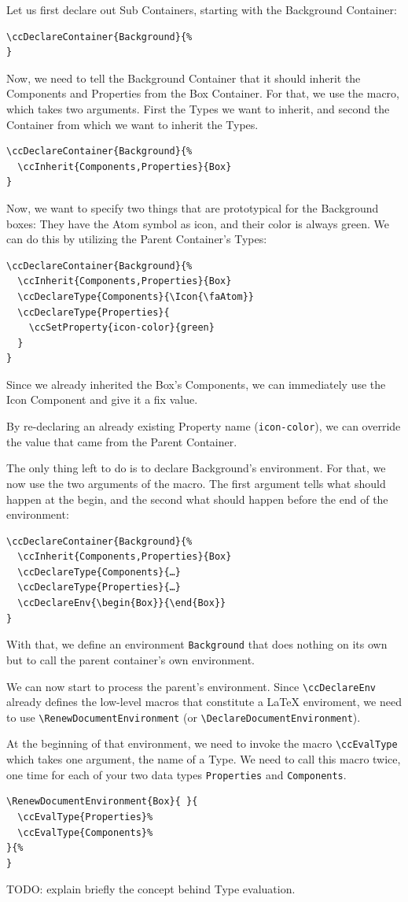 Let us first declare out Sub Containers, starting with the Background
Container:
\begin{lstlisting}
\ccDeclareContainer{Background}{%
}
\end{lstlisting}
Now, we need to tell the Background Container that it should inherit
the Components and Properties from the Box Container. For that, we use
the \UsageMacro{\ccInherit} macro, which takes two arguments. First
the Types we want to inherit, and second the Container from which we
want to inherit the Types.
\begin{lstlisting}
\ccDeclareContainer{Background}{%
  \ccInherit{Components,Properties}{Box}
}
\end{lstlisting}
Now, we want to specify two things that are prototypical for the
Background boxes: They have the Atom symbol as icon, and their color
is always green. We can do this by utilizing the Parent Container's
Types:
\begin{lstlisting}
\ccDeclareContainer{Background}{%
  \ccInherit{Components,Properties}{Box}
  \ccDeclareType{Components}{\Icon{\faAtom}}
  \ccDeclareType{Properties}{
    \ccSetProperty{icon-color}{green}
  }
}
\end{lstlisting}
Since we already inherited the Box's Components, we can immediately
use the Icon Component and give it a fix value.

By re-declaring an already existing Property name
(\texttt{icon-color}), we can override the value that came from the
Parent Container.

The only thing left to do is to declare Background's environment. For
that, we now use the two arguments of the \UsageMacro{\ccDeclareEnv}
macro. The first argument tells {\CoCoTeX} what should happen at the
begin, and the second what should happen before the end of the
environment:
\begin{lstlisting}
\ccDeclareContainer{Background}{%
  \ccInherit{Components,Properties}{Box}
  \ccDeclareType{Components}{…}
  \ccDeclareType{Properties}{…}
  \ccDeclareEnv{\begin{Box}}{\end{Box}}
}
\end{lstlisting}
With that, we define an environment \texttt{Background} that does
nothing on its own but to call the parent container's own environment.

We can now start to process the parent's environment. Since
\lstinline{\ccDeclareEnv} already defines the low-level macros that
constitute a {\LaTeX} enviroment, we need to use
\lstinline{\RenewDocumentEnvironment} (or
\lstinline{\DeclareDocumentEnvironment}).

At the beginning of that environment, we need to invoke the macro
\lstinline{\ccEvalType} which takes one argument, the name of a
Type. We need to call this macro twice, one time for each of your two
data types \texttt{Properties} and \texttt{Components}.
\begin{lstlisting}
\RenewDocumentEnvironment{Box}{ }{
  \ccEvalType{Properties}%
  \ccEvalType{Components}%
}{%
}
\end{lstlisting}
TODO: explain briefly the concept behind Type evaluation.
